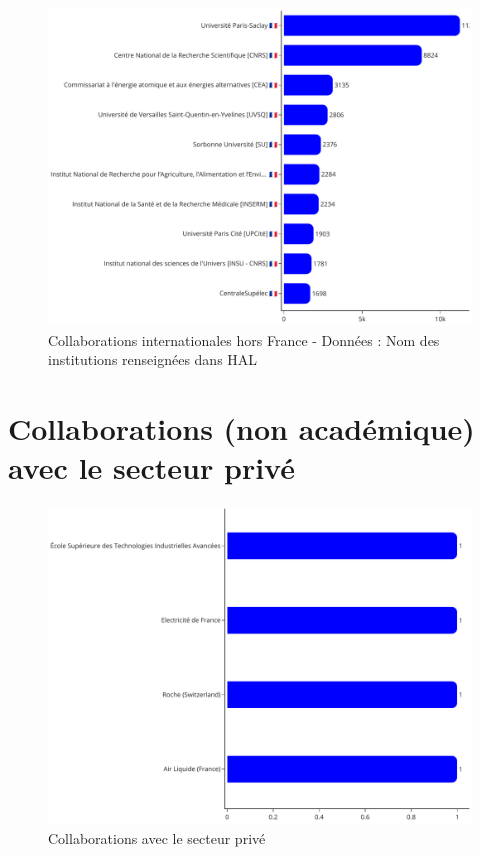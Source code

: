 \documentclass[french, 11pt]{dibiso/biso}
\begin{document}
\begin{figure}[!h]
  \includegraphics[width=\textwidth]{figures/collaboration_names.pdf}
  \caption{Collaborations internationales hors France - Données : Nom des institutions renseignées dans HAL}
  \label{fig_collab_names}
\end{figure}







\pagebreak

\section{Collaborations (non académique) avec le secteur privé}

\begin{figure}[!h]
  \includegraphics[width=.8\textwidth]{figures/private_sector_collaborations.pdf}
  \centering
  \caption{Collaborations avec le secteur privé}
  \label{fig_private_collab}
\end{figure}
\end{document}
